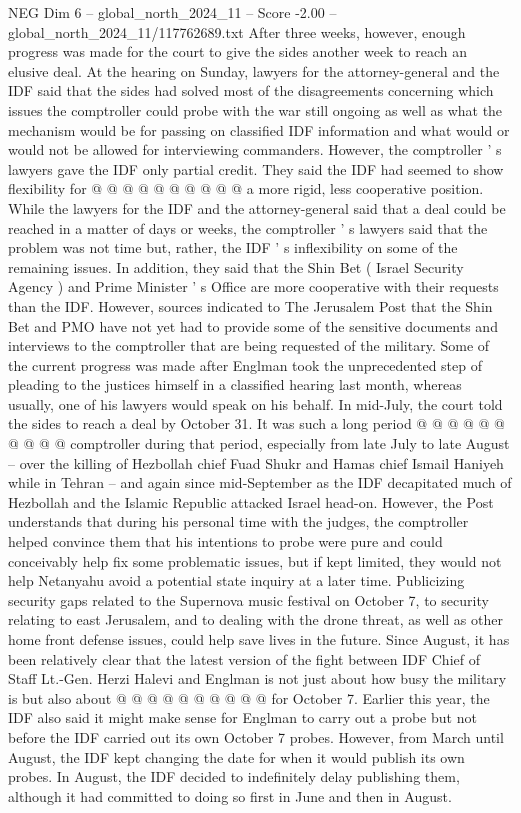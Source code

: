 \begin{textsample}{NEG Dim 6 – global\_north\_2024\_11 – Score -2.00 – global\_north\_2024\_11/117762689.txt}
After three weeks, however, enough progress was made for the court to give the sides another week to reach an elusive deal.
At the hearing on Sunday, lawyers for the attorney-general and the IDF said that the sides had solved most of the disagreements concerning which issues the comptroller could probe with the war still ongoing as well as what the mechanism would be for passing on classified IDF information and what would or would not be allowed for interviewing commanders.
However, the comptroller ' s lawyers gave the IDF only partial credit.
They said the IDF had seemed to show flexibility for @ @ @ @ @ @ @ @ @ @ a more rigid, less cooperative position.
While the lawyers for the IDF and the attorney-general said that a deal could be reached in a matter of days or weeks, the comptroller ' s lawyers said that the problem was not time but, rather, the IDF ' s inflexibility on some of the remaining issues.
In addition, they said that the Shin Bet ( Israel Security Agency ) and Prime Minister ' s Office are more cooperative with their requests than the IDF.
However, sources indicated to The Jerusalem Post that the Shin Bet and PMO have not yet had to provide some of the sensitive documents and interviews to the comptroller that are being requested of the military.
Some of the current progress was made after Englman took the unprecedented step of pleading to the justices himself in a classified hearing last month, whereas usually, one of his lawyers would speak on his behalf.
In mid-July, the court told the sides to reach a deal by October 31.
It was such a long period @ @ @ @ @ @ @ @ @ @ comptroller during that period, especially from late July to late August -- over the killing of Hezbollah chief Fuad Shukr and Hamas chief Ismail Haniyeh while in Tehran -- and again since mid-September as the IDF decapitated much of Hezbollah and the Islamic Republic attacked Israel head-on.
However, the Post understands that during his personal time with the judges, the comptroller helped convince them that his intentions to probe were pure and could conceivably help fix some problematic issues, but if kept limited, they would not help Netanyahu avoid a potential state inquiry at a later time.
Publicizing security gaps related to the Supernova music festival on October 7, to security relating to east Jerusalem, and to dealing with the drone threat, as well as other home front defense issues, could help save lives in the future.
Since August, it has been relatively clear that the latest version of the fight between IDF Chief of Staff Lt.-Gen.
Herzi Halevi and Englman is not just about how busy the military is but also about @ @ @ @ @ @ @ @ @ @ for October 7.
Earlier this year, the IDF also said it might make sense for Englman to carry out a probe but not before the IDF carried out its own October 7 probes.
However, from March until August, the IDF kept changing the date for when it would publish its own probes.
In August, the IDF decided to indefinitely delay publishing them, although it had committed to doing so first in June and then in August.

\end{textsample}
